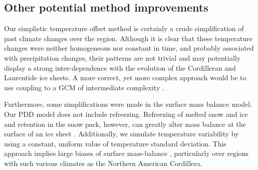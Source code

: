 \subsection{Other potential method improvements}

Our simplistic temperature offset method is certainly a crude simplification of past climate changes over the region. Although it is clear that these temperature changes were neither homogeneous nor constant in time, and probably associated with precipitation changes, their patterns are not trivial and may potentially display a strong inter-dependence with the evolution of the Cordilleran and Laurentide ice sheets. A more correct, yet more complex approach would be to use coupling to a GCM of intermediate complexity \citep{yoshimori-etal-2001,calov-etal-2002,abeouchi-etal-2007,charbit-etal-2013}.

Furthermore, some simplifications were made in the surface mass balance model. Our PDD model does not include refreezing. Refreezing of melted snow and ice and retention in the snow pack, however, can greatly alter mass balance at the surface of an ice sheet \citep{janssens-huybrechts-2000}. Additionally, we simulate temperature variability by using a constant, uniform value of temperature standard deviation. This approach implies large biases of surface mass-balance \citep{charbit-etal-2013,rau-rogozhina-2013,seguinot-inpress}, particularly over regions with such various climates as the Northern American Cordillera.

